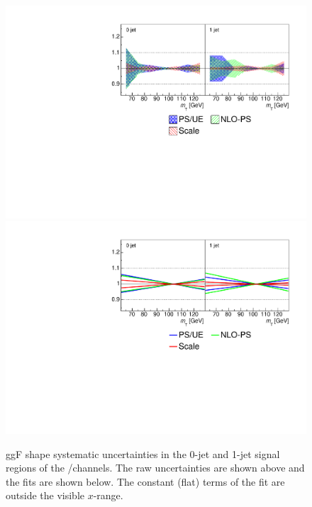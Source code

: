 \begin{figure}[t]
	\includegraphics[width=\largefigwidth]{custom_images/mT-shapes/ggf}
	\\
	\includegraphics[width=\largefigwidth]{custom_images/mT-shapes/ggf_fits}
	\caption{ggF \mt shape systematic uncertainties in the 0-jet and 1-jet signal regions 
	of the \emch/\mech channels. The raw uncertainties are shown above and the fits are 
	shown below. The constant (flat) terms of the fit are outside the visible $x$-range.}
	\label{fig:signal:mTshape}
\end{figure}

